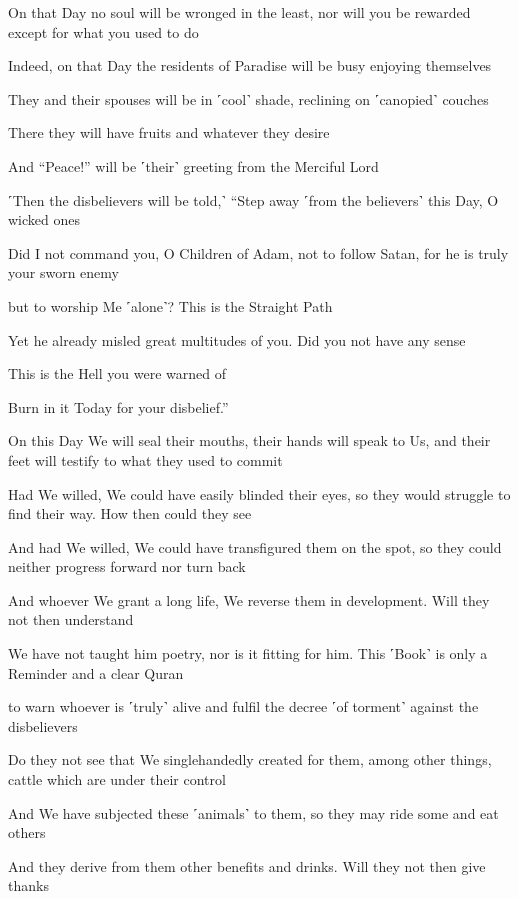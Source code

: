 On that Day no soul will be wronged in the least, nor will you be rewarded except for what you used to do

Indeed, on that Day the residents of Paradise will be busy enjoying themselves

They and their spouses will be in ˹cool˺ shade, reclining on ˹canopied˺ couches

There they will have fruits and whatever they desire

And “Peace!” will be ˹their˺ greeting from the Merciful Lord

˹Then the disbelievers will be told,˺ “Step away ˹from the believers˺ this Day, O wicked ones

Did I not command you, O Children of Adam, not to follow Satan, for he is truly your sworn enemy

but to worship Me ˹alone˺? This is the Straight Path

Yet he already misled great multitudes of you. Did you not have any sense

This is the Hell you were warned of

Burn in it Today for your disbelief.”

On this Day We will seal their mouths, their hands will speak to Us, and their feet will testify to what they used to commit

Had We willed, We could have easily blinded their eyes, so they would struggle to find their way. How then could they see

And had We willed, We could have transfigured them on the spot, so they could neither progress forward nor turn back

And whoever We grant a long life, We reverse them in development. Will they not then understand

We have not taught him poetry, nor is it fitting for him. This ˹Book˺ is only a Reminder and a clear Quran

to warn whoever is ˹truly˺ alive and fulfil the decree ˹of torment˺ against the disbelievers

Do they not see that We singlehandedly created for them, among other things, cattle which are under their control

And We have subjected these ˹animals˺ to them, so they may ride some and eat others

And they derive from them other benefits and drinks. Will they not then give thanks

